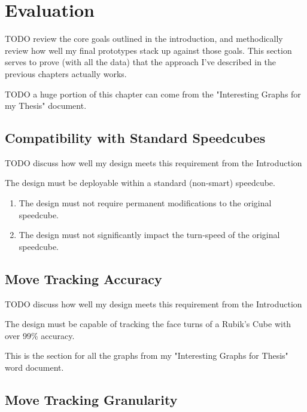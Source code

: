 
\chapter{Evaluation} %

\label{Chapter7} %

TODO review the core goals outlined in the introduction, and methodically review how well my final prototypes stack up against those goals. This section serves to prove (with all the data) that the approach I've described in the previous chapters actually works.

TODO a huge portion of this chapter can come from the "Interesting Graphs for my Thesis" document.


\section{Compatibility with Standard Speedcubes}

TODO discuss how well my design meets this requirement from the Introduction

The design must be deployable within a standard (non-smart) speedcube.
\begin{enumerate} 
    \item The design must not require permanent modifications to the original speedcube.
    \item The design must not significantly impact the turn-speed of the original speedcube.
\end{enumerate}


\section{Move Tracking Accuracy}

TODO discuss how well my design meets this requirement from the Introduction

The design must be capable of tracking the face turns of a Rubik's Cube with over 99\% accuracy.

This is the section for all the graphs from my "Interesting Graphs for Thesis" word document.


\section{Move Tracking Granularity}

